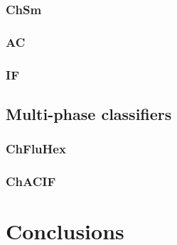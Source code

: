 \documentclass[12pt]{article}
\begin{document}
\subsubsection{ChSm}

\subsubsection{AC}

\subsubsection{IF}

\subsection{Multi-phase classifiers}
\subsubsection{ChFluHex}

\subsubsection{ChACIF}

\section{Conclusions}



\appendix
\appendixpage
\end{document}
